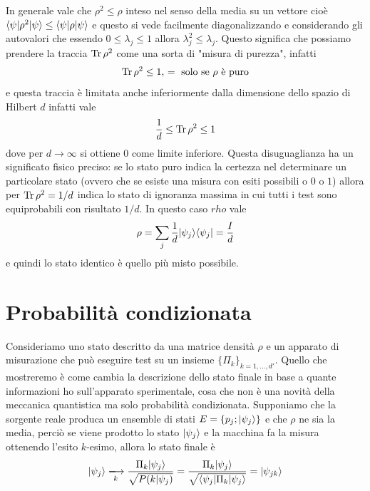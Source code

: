 In generale vale che $ \rho^2 \leq \rho $ inteso nel senso della media su un vettore cioè $ \langle \psi | \rho^2 | \psi \rangle \leq \langle \psi | \rho | \psi \rangle $ e 
questo si vede facilmente diagonalizzando e considerando gli autovalori che essendo $ 0 \leq \lambda_j \leq 1 $ allora $ \lambda_j^2 \leq \lambda_j $. 
Questo significa che possiamo prendere la traccia $ \operatorname{\textnormal{Tr}} \rho^2 $ come una sorta di "misura di purezza", infatti 
\begin{align*}
  \operatorname{\textnormal{Tr}} \rho^2 \leq 1, \, = \text{ solo se } \rho \text{ è puro}
\end{align*}
e questa traccia è limitata anche inferiormente dalla dimensione dello spazio di Hilbert $ d $ infatti vale 
\begin{align*}
  \frac1d \leq \operatorname{\textnormal{Tr}} \rho^2 \leq 1
\end{align*}
dove per $ d \to \infty $ si ottiene $ 0 $ come limite inferiore. Questa disuguaglianza ha un significato fisico preciso: se lo stato puro indica 
la certezza nel determinare un particolare stato (ovvero che se esiste una misura con esiti possibili o $ 0 $ o $ 1 $) allora per $ \operatorname{\textnormal{Tr}} \rho^2 = 1/d $ 
indica lo stato di ignoranza massima in cui tutti i test sono equiprobabili con risultato $ 1/d $. In questo caso $ rho $ vale 
\begin{align*}
  \rho = \sum_j \frac1d \vert \psi_j \rangle \langle \psi_j \vert = \frac{I}d
\end{align*}
e quindi lo stato identico è quello più misto possibile.

\section{Probabilità condizionata}

Consideriamo uno stato descritto da una matrice densità $ \rho $ e un apparato di misurazione che può eseguire test su un insieme 
$ \{\Pi_k\}_{k = 1, \dots, d'} $. Quello che mostreremo è come cambia la descrizione dello stato finale in base a quante informazioni ho 
sull'apparato sperimentale, cosa che non è una novità della meccanica quantistica ma solo probabilità condizionata. 
Supponiamo che la sorgente reale produca un ensemble di stati $ E = \{p_j ; \vert \psi_j \rangle\} $ e che $ \rho $ ne sia la media, perciò se viene prodotto lo 
stato $ \vert \psi_j \rangle $ e la macchina fa la misura ottenendo l'esito $ k $-esimo, allora lo stato finale è 
\begin{align*}
  \k{\psi_j} \xlongrightarrow[k]{} \frac{\Pi_k \k{\psi_j}}{\sqrt{P(k|\psi_j)}} 
  = \frac{\Pi_k \k{\psi_j}}{\sqrt{\bk{\psi_j | \Pi_k | \psi_j}}} = \k{\psi_{jk}}
\end{align*}

